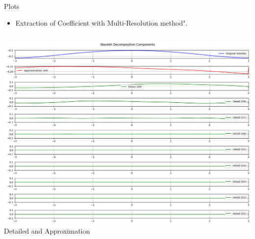 \documentclass{beamer}
\begin{document}
\begin{frame}{Plots}
        \begin{itemize}
        \item Extraction of Coefficient with Multi-Resolution method".\\[0.5cm]
        \end{itemize}
    \begin{columns}[T]
        \centering
        \includegraphics[width=\textwidth]{3.png} \\[0.2cm] %
        {\scriptsize Detailed and Approximation} %
        \centering

\end{columns}
\end{frame}
\end{document}
